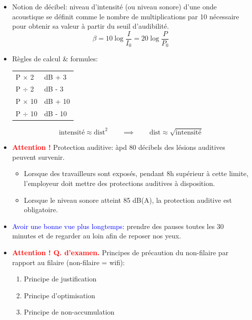 \documentclass[a4paper]{article}
\begin{document}
\begin{itemize}
\item Notion de décibel: niveau d’intensité (ou niveau sonore) d’une onde acoustique se définit comme le nombre de multiplications par 10 nécessaire pour obtenir sa valeur à partir du seuil d’audibilité.
\[ \beta = 10 \log \frac{I}{I_0} = 20 \log \frac{P}{P_0} \]





\item Règles de calcul \& formules:
\begin{center}
\begin{tabular}{ll}
    P $ \times $ 2  & dB + 3 \\
    P $ \div $ 2  & dB - 3 \\
    P $ \times $ 10  & dB + 10 \\
    P $ \div $ 10  & dB - 10
\end{tabular}
\end{center}
\[ \text{intensité} \approx \text{dist}^2 \qquad  \implies  \qquad \text{dist} \approx \sqrt{\text{intensité}} \]





\item \textcolor{red}{\textbf{Attention !}} Protection auditive: àpd 80 décibels des lésions auditives peuvent survenir.
\begin{itemize}
    \item Lorsque des travailleurs sont exposés, pendant 8h supérieur à cette limite, l’employeur doit mettre des protections auditives à disposition.
    \item Lorsque le niveau sonore atteint 85 dB(A), la protection auditive est obligatoire.
\end{itemize}





\item \textcolor{blue}{Avoir une bonne vue plus longtemps}: prendre des pauses toutes les 30 minutes et de regarder au loin afin de reposer nos yeux.





\item \textcolor{red}{\textbf{Attention ! Q. d'examen.}} Principes de précaution du non-filaire par rapport au filaire (non-filaire = wifi):
\begin{enumerate}
    \item Principe de justification
    \item Principe d’optimisation
    \item Principe de non-accumulation
\end{enumerate}






\end{itemize}
\end{document}
